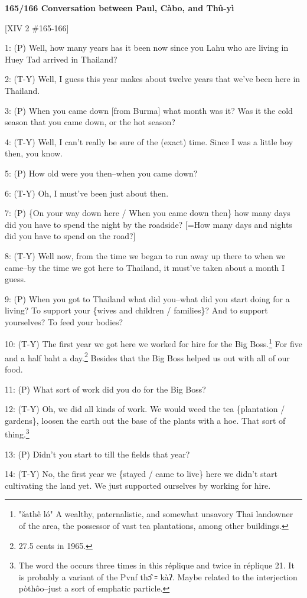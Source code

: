 
\textbf{165/166 Conversation between Paul, Càbo, and Thû-yì}

[XIV 2 \#165-166]

1: (P) Well, how many years has it been now since you Lahu who are living in Huey
Tad arrived in Thailand?

2: (T-Y) Well, I guess this year makes about twelve years that we've been here
in Thailand.

3: (P) When you came down [from Burma] what month was it? Was it the cold season
that you came down, or the hot season?

4: (T-Y) Well, I can't really be sure of the (exact) time. Since I was a little
boy then, you know.

5: (P) How old were you then--when you came down?

6: (T-Y) Oh, I must've been just about then.

7: (P) \{On your way down here / When you came down then\} how many days did you
have to spend the night by the roadside? [=How many days and nights did you have
to spend on the road?]

8: (T-Y) Well now, from the time we began to run away up there to when we came--by
the time we got here to Thailand, it must've taken about a month I guess.

9: (P) When you got to Thailand what did you--what did you start doing for a living?
To support your \{wives and children / families\}? And to support yourselves? To
feed your bodies?

10: (T-Y) The first year we got here we worked for hire for the Big Boss.\footnote{"šathê ló" A wealthy, paternalistic, and somewhat unsavory Thai landowner of the area, the possessor of vast tea plantations, among other buildings.} For
five and a half baht a day.\footnote{27.5 cents in 1965.} Besides that the Big Boss helped us out with all
of our food.

11: (P) What sort of work did you do for the Big Boss?

12: (T-Y) Oh, we did all kinds of work. We would weed the tea \{plantation / gardens\},
loosen the earth out the base of the plants with a hoe. That sort of thing.\footnote{The word the occurs three times in this réplique and twice in réplique 21. It is probably a variant of the Pvnf thɔ̂ ꞊ kàʔ. Maybe related to the interjection pòthôo--just a sort of emphatic particle.}

13: (P) Didn't you start to till the fields that year?

14: (T-Y) No, the first year we \{stayed / came to live\} here we didn't start
cultivating the land yet. We just supported ourselves by working for hire.

